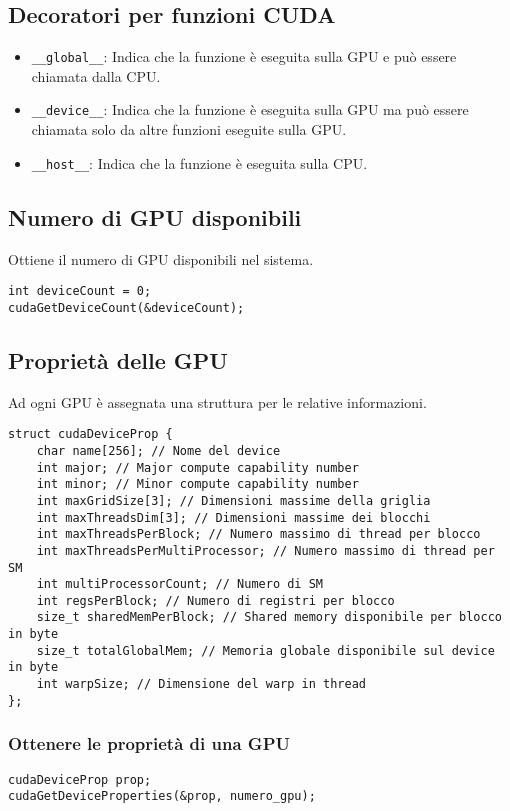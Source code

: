 \documentclass{article}
\begin{document}
\subsection{Decoratori per funzioni CUDA}
\begin{itemize}
    \item \texttt{\_\_global\_\_}: Indica che la funzione è eseguita sulla GPU e può essere chiamata dalla CPU.
    \item \texttt{\_\_device\_\_}: Indica che la funzione è eseguita sulla GPU ma può essere chiamata solo da altre funzioni eseguite sulla GPU.
    \item \texttt{\_\_host\_\_}: Indica che la funzione è eseguita sulla CPU.
\end{itemize}

\subsection{Numero di GPU disponibili}
Ottiene il numero di GPU disponibili nel sistema.
\begin{verbatim}
int deviceCount = 0;
cudaGetDeviceCount(&deviceCount);
\end{verbatim}

\subsection{Proprietà delle GPU}
Ad ogni GPU è assegnata una struttura per le relative informazioni.
\begin{verbatim}
struct cudaDeviceProp {
    char name[256]; // Nome del device
    int major; // Major compute capability number
    int minor; // Minor compute capability number
    int maxGridSize[3]; // Dimensioni massime della griglia
    int maxThreadsDim[3]; // Dimensioni massime dei blocchi
    int maxThreadsPerBlock; // Numero massimo di thread per blocco
    int maxThreadsPerMultiProcessor; // Numero massimo di thread per SM
    int multiProcessorCount; // Numero di SM
    int regsPerBlock; // Numero di registri per blocco
    size_t sharedMemPerBlock; // Shared memory disponibile per blocco in byte
    size_t totalGlobalMem; // Memoria globale disponibile sul device in byte
    int warpSize; // Dimensione del warp in thread
};
\end{verbatim}

\subsubsection{Ottenere le proprietà di una GPU}
\begin{verbatim}
cudaDeviceProp prop;
cudaGetDeviceProperties(&prop, numero_gpu);
\end{verbatim}
\end{document}
